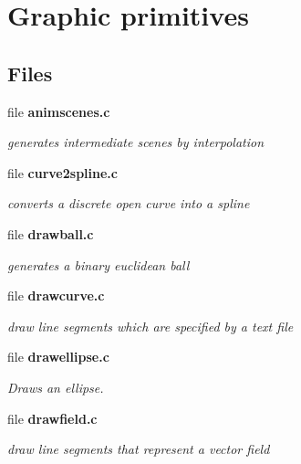 \section{Graphic primitives}
\label{group__draw}
\subsection*{Files}
\begin{CompactItemize}
\item 
file {\bf animscenes.c}
\begin{CompactList}\small\item\em generates intermediate scenes by interpolation \item\end{CompactList}

\item 
file {\bf curve2spline.c}
\begin{CompactList}\small\item\em converts a discrete open curve into a spline \item\end{CompactList}

\item 
file {\bf drawball.c}
\begin{CompactList}\small\item\em generates a binary euclidean ball \item\end{CompactList}

\item 
file {\bf drawcurve.c}
\begin{CompactList}\small\item\em draw line segments which are specified by a text file \item\end{CompactList}

\item 
file {\bf drawellipse.c}
\begin{CompactList}\small\item\em Draws an ellipse. \item\end{CompactList}

\item 
file {\bf drawfield.c}
\begin{CompactList}\small\item\em draw line segments that represent a vector field \item\end{CompactList}


\end{CompactItemize}
